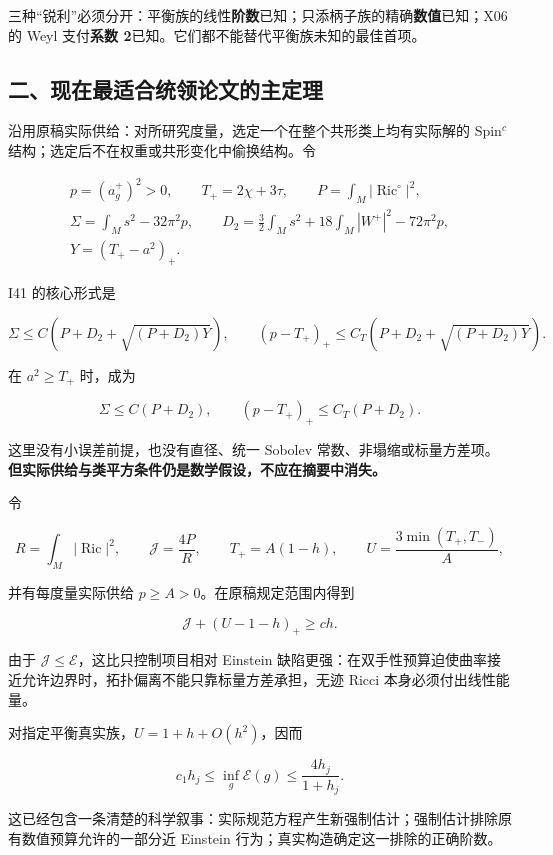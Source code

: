\documentclass[
  10pt,
]{article}
\begin{document}
三种``锐利''必须分开：平衡族的线性\textbf{阶数}已知；只添柄子族的精确\textbf{数值}已知；X06
的 Weyl 支付\textbf{系数 2}已知。它们都不能替代平衡族未知的最佳首项。

\hypertarget{ux4e8cux73b0ux5728ux6700ux9002ux5408ux7edfux9886ux8bbaux6587ux7684ux4e3bux5b9aux7406}{%
\subsection{二、现在最适合统领论文的主定理}\label{ux4e8cux73b0ux5728ux6700ux9002ux5408ux7edfux9886ux8bbaux6587ux7684ux4e3bux5b9aux7406}}

沿用原稿实际供给：对所研究度量，选定一个在整个共形类上均有实际解的
Spin\(^c\) 结构；选定后不在权重或共形变化中偷换结构。令

\[
\begin{gathered}
p=(a_g^+)^2>0,\qquad T_+=2\chi+3\tau,\qquad
P=\int_M|\operatorname{Ric}^{\circ}|^2,\\
\Sigma=\int_Ms^2-32\pi^2p,\qquad
D_2=\frac32\int_Ms^2+18\int_M|W^+|^2-72\pi^2p,\\
Y=(T_+-a^2)_+.
\end{gathered}
\]

I41 的核心形式是

\[
\boxed{
\Sigma\le C\left(P+D_2+\sqrt{(P+D_2)Y}\right),\qquad
(p-T_+)_+\le C_T\left(P+D_2+\sqrt{(P+D_2)Y}\right).
}
\]

在 \(a^2\ge T_+\) 时，成为

\[
\boxed{\Sigma\le C(P+D_2),\qquad (p-T_+)_+\le C_T(P+D_2).}
\]

这里没有小误差前提，也没有直径、统一 Sobolev
常数、非塌缩或标量方差项。\textbf{但实际供给与类平方条件仍是数学假设，不应在摘要中消失。}

令

\[
R=\int_M|\operatorname{Ric}|^2,\qquad
\mathcal J=\frac{4P}{R},\qquad
T_+=A(1-h),\qquad
U=\frac{3\min(T_+,T_-)}A,
\]

并有每度量实际供给 \(p\ge A>0\)。在原稿规定范围内得到

\[
\boxed{\mathcal J+(U-1-h)_+\ge ch.}
\]

由于 \(\mathcal J\le\mathcal E\)，这比只控制项目相对 Einstein
缺陷更强：在双手性预算迫使曲率接近允许边界时，拓扑偏离不能只靠标量方差承担，无迹
Ricci 本身必须付出线性能量。

对指定平衡真实族，\(U=1+h+O(h^2)\)，因而

\[
\boxed{c_1h_j\le\inf_g\mathcal E(g)\le\frac{4h_j}{1+h_j}.}
\]

这已经包含一条清楚的科学叙事：实际规范方程产生新强制估计；强制估计排除原有数值预算允许的一部分近
Einstein 行为；真实构造确定这一排除的正确阶数。
\end{document}
